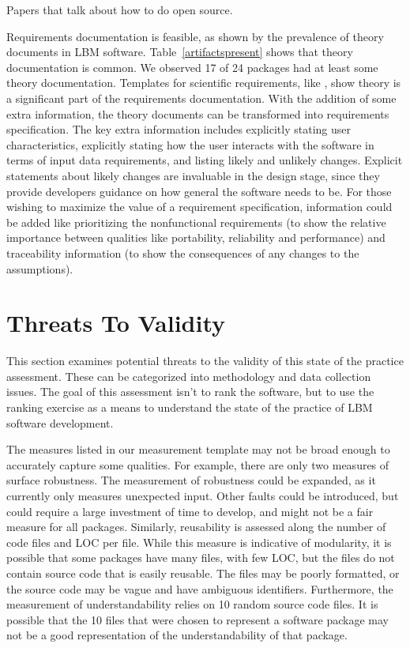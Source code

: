 \documentclass[runningheads]{llncs}
\begin{document}
Papers that talk about how to do open source.

Requirements documentation is feasible, as shown by the prevalence of theory
documents in LBM software.  Table~\ref{artifactspresent} shows that theory
documentation is common.  We observed 17 of 24 packages had at least some theory
documentation. Templates for scientific requirements, like
\cite{SmithEtAl2007,SmithAndLai2005}, show theory is a significant part of the
requirements documentation. With the addition of some extra information, the
theory documents can be transformed into requirements specification.  The key
extra information includes explicitly stating user characteristics, explicitly
stating how the user interacts with the software in terms of input data
requirements, and listing likely and unlikely changes.  Explicit statements
about likely changes are invaluable in the design stage, since they provide
developers guidance on how general the software needs to be.  For those wishing
to maximize the value of a requirement specification, information could be added
like prioritizing the nonfunctional requirements (to show the relative
importance between qualities like portability, reliability and performance) and
traceability information (to show the consequences of any changes to the
assumptions).

\section{Threats To Validity} \label{threats}

This section examines potential threats to the validity of this state of the
practice assessment. These can be categorized into methodology and data
collection issues. The goal of this assessment isn't to rank the software, but
to use the ranking exercise as a means to understand the state of the practice
of LBM software development.

The measures listed in our measurement template may not be broad enough to
accurately capture some qualities. For example, there are only two measures of
surface robustness. The measurement of robustness could be expanded, as it
currently only measures unexpected input. Other faults could be introduced, but
could require a large investment of time to develop, and might not be a fair
measure for all packages. Similarly, reusability is assessed along the number of
code files and LOC per file. While this measure is indicative of modularity, it
is possible that some packages have many files, with few LOC, but the files do
not contain source code that is easily reusable. The files may be poorly
formatted, or the source code may be vague and have ambiguous identifiers.
Furthermore, the measurement of understandability relies on 10 random source
code files. It is possible that the 10 files that were chosen to represent a
software package may not be a good representation of the understandability of
that package.
\end{document}

